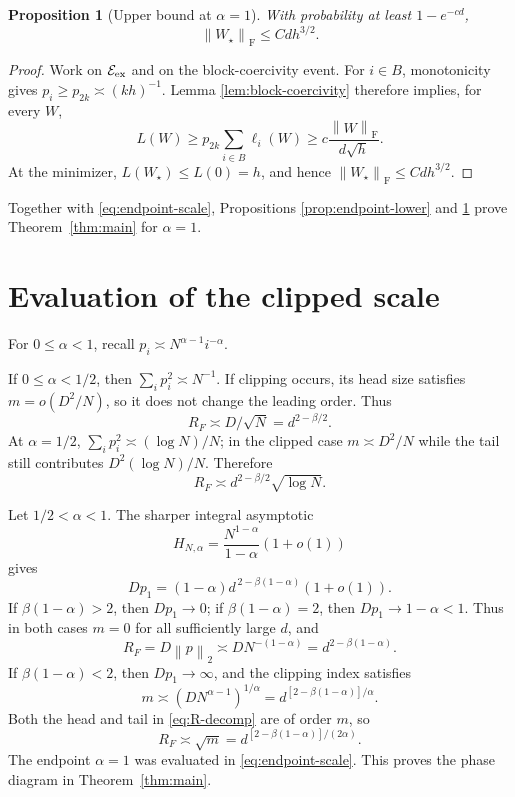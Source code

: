 \documentclass[11pt]{article}
\newtheorem{proposition}[theorem]{Proposition}
\theoremstyle{remark}
\newcommand{\norm}[1]{\left\lVert #1\right\rVert}
\newcommand{\F}{\mathrm{F}}
\newcommand{\1}{\mathbf 1}
\begin{document}
\begin{proposition}[Upper bound at $\alpha=1$]
\label{prop:endpoint-upper}
With probability at least $1-e^{-cd}$,
\[
 \norm{W_\star}_{\F}\leq Cdh^{3/2}.
\]
\end{proposition}

\begin{proof}
Work on $\mathcal E_{\rm ex}$ and on the block-coercivity event.  For
$i\in B$, monotonicity gives
$p_i\geq p_{2k}\asymp(kh)^{-1}$.  Lemma
\ref{lem:block-coercivity} therefore implies, for every $W$,
\[
 L(W)
 \geq p_{2k}\sum_{i\in B}\ell_i(W)
 \geq c\frac{\norm W_{\F}}{d\sqrt h}.
\]
At the minimizer, $L(W_\star)\leq L(0)=h$, and hence
$\norm{W_\star}_{\F}\leq Cdh^{3/2}$.
\end{proof}

Together with \eqref{eq:endpoint-scale}, Propositions
\ref{prop:endpoint-lower} and \ref{prop:endpoint-upper} prove
Theorem~\ref{thm:main} for $\alpha=1$.

\section{Evaluation of the clipped scale}

For $0\leq\alpha<1$, recall
$p_i\asymp N^{\alpha-1}i^{-\alpha}$.

If $0\leq\alpha<1/2$, then $\sum_i p_i^2\asymp N^{-1}$.  If clipping
occurs, its head size satisfies $m=o(D^2/N)$, so it does not change the
leading order.  Thus
\[
 R_F\asymp D/\sqrt N=d^{2-\beta/2}.
\]
At $\alpha=1/2$,
$\sum_i p_i^2\asymp(\log N)/N$; in the clipped case
$m\asymp D^2/N$ while the tail still contributes
$D^2(\log N)/N$.  Therefore
\[
 R_F\asymp d^{2-\beta/2}\sqrt{\log N}.
\]

Let $1/2<\alpha<1$.  The sharper integral asymptotic
\[
 H_{N,\alpha}=\frac{N^{1-\alpha}}{1-\alpha}(1+o(1))
\]
gives
\[
 Dp_1=(1-\alpha)d^{\,2-\beta(1-\alpha)}(1+o(1)).
\]
If $\beta(1-\alpha)>2$, then $Dp_1\to0$; if
$\beta(1-\alpha)=2$, then $Dp_1\to1-\alpha<1$.  Thus in both cases
$m=0$ for all sufficiently large $d$, and
\[
 R_F=D\norm p_2\asymp DN^{-(1-\alpha)}
 =d^{2-\beta(1-\alpha)}.
\]
If $\beta(1-\alpha)<2$, then $Dp_1\to\infty$, and the clipping
index satisfies
\[
 m\asymp(DN^{\alpha-1})^{1/\alpha}
 =d^{[2-\beta(1-\alpha)]/\alpha}.
\]
Both the head and tail in \eqref{eq:R-decomp} are of order $m$, so
\[
 R_F\asymp\sqrt m
 =d^{[2-\beta(1-\alpha)]/(2\alpha)}.
\]
The endpoint $\alpha=1$ was evaluated in
\eqref{eq:endpoint-scale}.  This proves the phase diagram in
Theorem~\ref{thm:main}.
\end{document}
